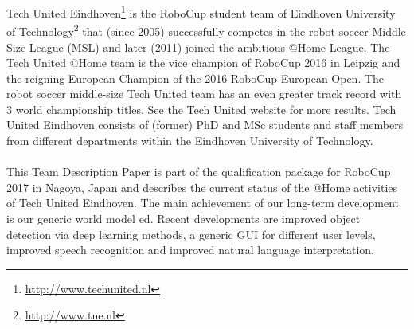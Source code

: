Tech United Eindhoven\footnote{\url{http://www.techunited.nl}} is the RoboCup student team of Eindhoven University of Technology\footnote{\url{http://www.tue.nl}} that (since 2005) successfully competes in the robot soccer Middle Size League (MSL) and later (2011) joined the ambitious @Home League. The Tech United @Home team is the vice champion of RoboCup 2016 in Leipzig and the reigning European Champion of the 2016 RoboCup European Open. The robot soccer middle-size Tech United team has an even greater track record with 3 world championship titles. See the Tech United website for more results. Tech United Eindhoven consists of (former) PhD and MSc students and staff members from different departments within the Eindhoven University of Technology.
\\\\
This Team Description Paper is part of the qualification package for RoboCup 2017 in Nagoya, Japan and describes the current status of the @Home activities of Tech United Eindhoven. The main achievement of our long-term development is our generic world model \acrshort{ed}. Recent developments are improved object detection via deep learning methods, a generic GUI for different user levels, improved speech recognition and improved natural language interpretation. 